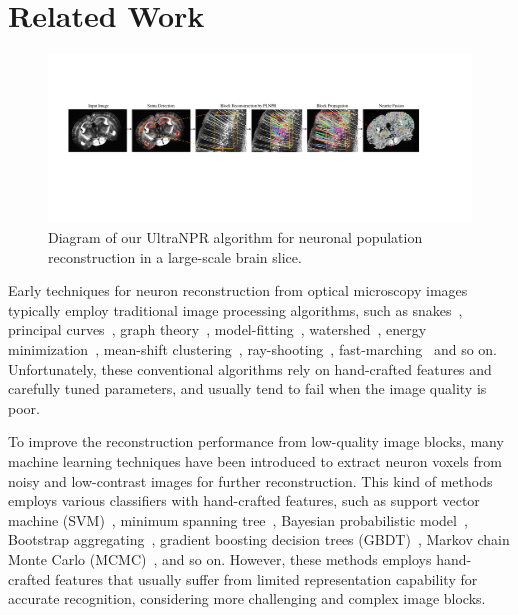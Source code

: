 \section{Related Work}
\label{sec:related work}
\begin{figure}[ht]
	\centering
	\includegraphics[width=1\textwidth]{./Illustrations/framework_ultranpr.pdf}
	\caption{Diagram of our UltraNPR algorithm for neuronal population reconstruction in a large-scale brain slice.}
	\label{fig:ultra_framework}
\end{figure}


Early techniques for neuron reconstruction from optical microscopy images typically employ traditional image processing algorithms, such as snakes~\cite{Wang2011, Cai2006}, principal curves~\cite{Bas2011}, graph theory~\cite{Peng2010a, Yang2013, De2016}, model-fitting~\cite{Zhao2011, Santamaria2015}, watershed~\cite{Navlakha2013, Suembuel2016}, energy minimization~\cite{Quan2013, Liu2016}, mean-shift clustering~\cite{Frasconi2014}, ray-shooting~\cite{Wu2014, Liu2019}, fast-marching~\cite{Peng2011, Xiao2013, Liu2018} and so on.
Unfortunately, these conventional algorithms rely on hand-crafted features and carefully tuned parameters, and usually tend to fail when the image quality is poor.

To improve the reconstruction performance from low-quality image blocks, many machine learning techniques have been introduced to extract neuron voxels from noisy and low-contrast images for further reconstruction. 
This kind of methods employs various classifiers with hand-crafted features, such as support vector machine (SVM)~\cite{Chen2015}, minimum spanning tree~\cite{Basu2016}, Bayesian probabilistic model~\cite{Radojevic2017}, Bootstrap aggregating~\cite{Wang2017}, gradient boosting decision trees (GBDT)~\cite{Gu2017}, Markov chain Monte Carlo (MCMC)~\cite{Skibbe2015, Skibbe2019}, and so on.
However, these methods employs hand-crafted features that usually suffer from limited representation capability for accurate recognition, considering more challenging and complex image blocks.


